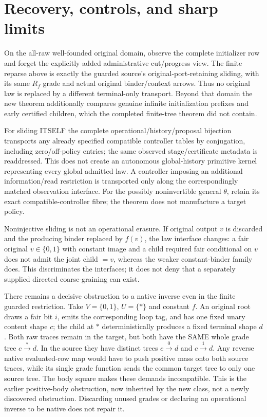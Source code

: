 \documentclass[11pt]{article}
\begin{document}
\section{Recovery, controls, and sharp limits}
On the all-raw well-founded original domain, observe the complete initializer row and forget the explicitly added administrative cut/progress view. The finite reparse above is exactly the guarded source's original-port-retaining sliding, with its same $R_f$ grade and actual original binder/context arrows. Thus no original law is replaced by a different terminal-only transport. Beyond that domain the new theorem additionally compares genuine infinite initialization prefixes and early certified children, which the completed finite-tree theorem did not contain.

For sliding ITSELF the complete operational/history/proposal bijection transports any already specified compatible controller tables by conjugation, including zero/off-policy entries; the same observed stage/certificate metadata is readdressed. This does not create an autonomous global-history primitive kernel representing every global admitted law. A controller imposing an additional information/read restriction is transported only along the correspondingly matched observation interface. For the possibly noninvertible general $\theta$, retain its exact compatible-controller fibre; the theorem does not manufacture a target policy.

Noninjective sliding is not an operational erasure. If original output $v$ is discarded and the producing binder replaced by $f(v)$, the law interface changes: a fair original $v\in\{0,1\}$ with constant image and a child required fair conditional on $v$ does not admit the joint child $=v$, whereas the weaker constant-binder family does. This discriminates the interfaces; it does not deny that a separately supplied directed coarse-graining can exist.

There remains a decisive obstruction to a native inverse even in the finite guarded restriction. Take $V=\{0,1\}$, $U=\{*\}$ and constant $f$. An original root draws a fair bit $i$, emits the corresponding loop tag, and has one fixed unary content shape $c$; the child at $*$ deterministically produces a fixed terminal shape $d$. Both raw traces remain in the target, but both have the SAME whole grade tree $c\xrightarrow{*}d$. In the source they have distinct trees $c\xrightarrow{0}d$ and $c\xrightarrow{1}d$. Any reverse native evaluated-row map would have to push positive mass onto both source traces, while its single grade function sends the common target tree to only one source tree. The body square makes these demands incompatible. This is the earlier positive-body obstruction, now inherited by the new class, not a newly discovered obstruction. Discarding unused grades or declaring an operational inverse to be native does not repair it.
\end{document}
